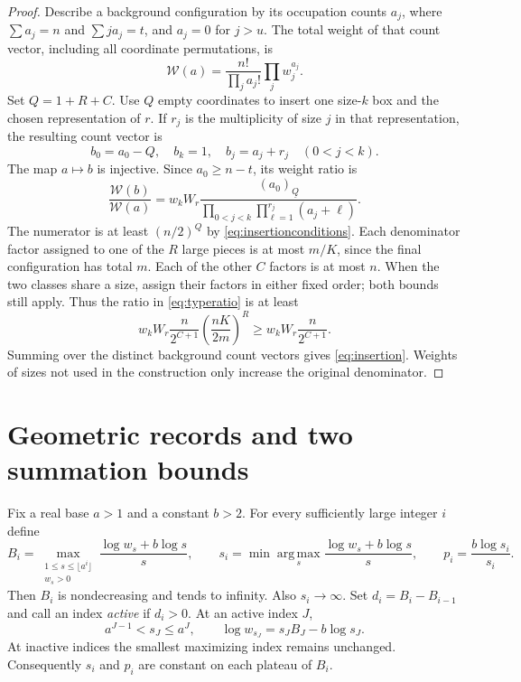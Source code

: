 \documentclass[11pt]{article}
\theoremstyle{remark}\newtheorem{remark}[theorem]{Remark}
\newcommand{\fall}[2]{(#1)_{\underline{#2}}}
\begin{document}
\begin{proof}
Describe a background configuration by its occupation counts $a_j$, where
$\sum a_j=n$ and $\sum j a_j=t$, and $a_j=0$ for $j>u$. The total weight of
that count vector, including all coordinate permutations, is
\[
 \mathcal W(a)=\frac{n!}{\prod_j a_j!}\prod_j w_j^{a_j}.
\]
Set $Q=1+R+C$. Use $Q$ empty coordinates to insert one size-$k$ box and the
chosen representation of $r$. If $r_j$ is the multiplicity of size $j$ in
that representation, the resulting count vector is
\[
 b_0=a_0-Q,\quad b_k=1,\quad b_j=a_j+r_j\quad(0<j<k).
\]
The map $a\mapsto b$ is injective. Since $a_0\ge n-t$, its weight ratio is
\begin{equation}\label{eq:typeratio}
 \frac{\mathcal W(b)}{\mathcal W(a)}
 =w_kW_r\frac{\fall{a_0}{Q}}
 {\displaystyle\prod_{0<j<k}\prod_{\ell=1}^{r_j}(a_j+\ell)}.
\end{equation}
The numerator is at least $(n/2)^Q$ by \eqref{eq:insertionconditions}.
Each denominator factor assigned to one of the $R$ large pieces is at most
$m/K$, since the final configuration has total $m$. Each of the other $C$
factors is at most $n$. When the two classes share a size, assign their
factors in either fixed order; both bounds still apply. Thus the ratio in
\eqref{eq:typeratio} is at least
\[
 w_kW_r\frac{n}{2^{C+1}}
       \left(\frac{nK}{2m}\right)^R
 \ge w_kW_r\frac{n}{2^{C+1}}.
\]
Summing over the distinct background count vectors gives
\eqref{eq:insertion}. Weights of sizes not used in the construction only
increase the original denominator.
\end{proof}

\section{Geometric records and two summation bounds}
Fix a real base $a>1$ and a constant $b>2$. For every sufficiently large
integer $i$ define
\begin{equation}\label{eq:records}
 B_i=\max_{\substack{1\le s\le\lfloor a^i\rfloor\\w_s>0}}
       \frac{\log w_s+b\log s}{s},\qquad
 s_i=\min\operatorname*{arg\,max}_{s}\frac{\log w_s+b\log s}{s},
 \qquad p_i=\frac{b\log s_i}{s_i}.
\end{equation}
Then $B_i$ is nondecreasing and tends to infinity. Also $s_i\to\infty$.
Set $d_i=B_i-B_{i-1}$ and call an index \emph{active} if $d_i>0$. At an
active index $J$,
\begin{equation}\label{eq:active}
 a^{J-1}<s_J\le a^J,\qquad
 \log w_{s_J}=s_JB_J-b\log s_J.
\end{equation}
At inactive indices the smallest maximizing index remains unchanged.
Consequently $s_i$ and $p_i$ are constant on each plateau of $B_i$.
\end{document}
